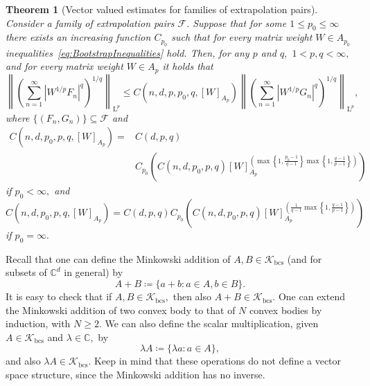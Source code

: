 \documentclass{article}
\newtheorem{theorem}{Theorem}
\theoremstyle{definition}
\theoremstyle{remark}
\numberwithin{equation}{section}
\newcommand{\norm}[2]{\left\|{#1}\right\|_{{#2}}}
\newcommand{\cF}{\mathcal{F}}
\newcommand{\cK}{\mathcal{K}}
\newcommand{\complex}{\mathbb{C}}
\newcommand{\convex}{\cK_{\mathrm{bcs}}}
\newcommand{\Lp}[1]{\mathrm{L}^{#1}}
\newcommand{\1}{\mathbf{1}}
\begin{document}
    \begin{theorem}[Vector valued estimates for families of extrapolation pairs]
        \label{thm:VectorValuedEstimates}
        Consider a family of extrapolation pairs $\cF.$
        Suppose that for some $1 \leq p_0 \leq \infty$ there exists an increasing function $C_{p_0}$
        such that for every matrix weight $W \in A_{p_0}$ inequalities~\eqref{eq:BootstrapInequalities} hold.
        Then, for any $p$ and $q,$ $1 < p,q < \infty,$ and for every matrix weight $W \in A_p$ it holds that
        \begin{equation*}
            \norm{\left(\sum_{n=1}^\infty |W^{1/p}F_n|^q\right)^{1/q}}{\Lp{p}}
            \leq C(n,d,p,p_0,q,[W]_{A_p}) \norm{\left(\sum_{n=1}^\infty |W^{1/p}G_n|^q\right)^{1/q}}{\Lp{p}},
        \end{equation*}
        where $\{(F_n,G_n)\} \subseteq \cF$ and
        \begin{align*}
            C(n,d,p_0,p,q,[W]_{A_p}) = &C(d,p,q)\\
                &C_{p_0}\left(C(n,d,p_0,p,q) [W]_{A_p}^{\left(\max\left\{1,\frac{p_0-1}{q-1}\right\}\max\left\{1,\frac{q-1}{p-1}\right\}\right)}\right)
        \end{align*}
        if $p_0 < \infty,$ and
        \begin{equation*}
            C(n,d,p_0,p,q,[W]_{A_p}) = C(d,p,q) C_{p_0}\left(C(n,d,p_0,p,q) [W]_{A_p}^{\left(\frac{1}{q-1}\max\left\{1,\frac{q-1}{p-1}\right\}\right)}\right)
        \end{equation*}
        if $p_0 = \infty.$
    \end{theorem}

    Recall that one can define the Minkowski addition of $A,B \in \convex$ (and for subsets of $\complex^d$ in general)
    by
    \begin{equation*}
        A + B \coloneq \{a + b\colon a \in A, b \in B\}.
    \end{equation*}
    It is easy to check that if $A,B \in \convex,$ then also $A+B \in \convex.$
    One can extend the Minkowski addition of two convex body to that of $N$ convex bodies by induction, with $N \geq 2.$
    We can also define the scalar multiplication, given $A \in \convex$ and $\lambda \in \complex,$ by
    \begin{equation*}
        \lambda A \coloneq \{\lambda a\colon a \in A\},
    \end{equation*}
    and also $\lambda A \in \convex.$
    Keep in mind that these operations do not define a vector space structure, since the Minkowski addition has no inverse.
    
\end{document}
